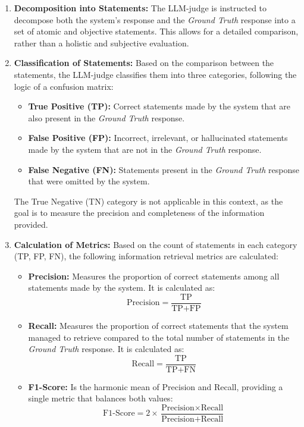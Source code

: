             \begin{enumerate}
                \item \textbf{Decomposition into Statements:} The LLM-judge is instructed to decompose both the system's response and the \textit{Ground Truth} response into a set of atomic and objective statements. This allows for a detailed comparison, rather than a holistic and subjective evaluation.

                \item \textbf{Classification of Statements:} Based on the comparison between the statements, the LLM-judge classifies them into three categories, following the logic of a confusion matrix:
                \begin{itemize}
                    \item \textbf{True Positive (TP):} Correct statements made by the system that are also present in the \textit{Ground Truth} response.
                    \item \textbf{False Positive (FP):} Incorrect, irrelevant, or hallucinated statements made by the system that are not in the \textit{Ground Truth} response.
                    \item \textbf{False Negative (FN):} Statements present in the \textit{Ground Truth} response that were omitted by the system.
                \end{itemize}
                The True Negative (TN) category is not applicable in this context, as the goal is to measure the precision and completeness of the information provided.

                \item \textbf{Calculation of Metrics:} Based on the count of statements in each category (TP, FP, FN), the following information retrieval metrics are calculated:
                \begin{itemize}
                    \item \textbf{Precision:} Measures the proportion of correct statements among all statements made by the system. It is calculated as:
                    $$ \text{Precision} = \frac{\text{TP}}{\text{TP} + \text{FP}} $$
                    \item \textbf{Recall:} Measures the proportion of correct statements that the system managed to retrieve compared to the total number of statements in the \textit{Ground Truth} response. It is calculated as:
                    $$ \text{Recall} = \frac{\text{TP}}{\text{TP} + \text{FN}} $$
                    \item \textbf{F1-Score:} Is the harmonic mean of Precision and Recall, providing a single metric that balances both values:
                    $$ \text{F1-Score} = 2 \times \frac{\text{Precision} \times \text{Recall}}{\text{Precision} + \text{Recall}} $$
                \end{itemize}
            \end{enumerate}

